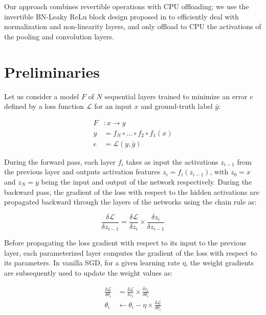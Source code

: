 \documentclass[11pt,onecolumn]{article}
\begin{document}
Our approach combines revertible operations with CPU offloading:
we use the invertible BN-Leaky ReLu block design proposed in \cite{rota2018place} 
to efficiently deal with normalization and non-linearity layers,
and only offload to CPU the activations of the pooling and convolution layers.

\section{Preliminaries}

Let us consider a model $F$ of $N$ sequential layers trained to minimize an error $e$ 
defined by a loss function $\mathcal{L}$ for an input $x$ and ground-truth label $\bar{y}$:

\begin{subequations}
	\begin{align}
	F &: x \rightarrow y \\
	y &= f_N \circ ... \circ f_2 \circ f_1(x) \\
	e &=  \mathcal{L}(y, \bar{y})
	\end{align}
\end{subequations}

During the forward pass, each layer $f_i$ takes as input the activations $z_{i-1}$ from the previous layer and outputs activation features $z_i=f_i(z_{i-1})$, with $z_0=x$ and $z_N=y$ being the input and output of the network respectively.
During the backward pass, the gradient of the loss with respect to the hidden activations are propagated backward through the layers of the networks using the chain rule as:

\begin{equation}
\frac{\delta \mathcal{L}}{\delta z_{i-1}} = \frac{\delta \mathcal{L}}{\delta z_{i}}  \times \frac{\delta z_{i}}{\delta z_{i-1}}
\end{equation}

Before propagating the loss gradient with respect to its input to the previous layer, 
each parameterized layer computes the gradient of the loss with respect to its parameters. 
In vanilla SGD, for a given learning rate $\eta$, the weight gradients are subsequently used to update the weight values as:

\begin{subequations}
	\begin{align}
	\frac{\delta \mathcal{L}}{\delta \theta_i} & =\frac{\delta \mathcal{L}}{\delta z_{i}}  \times \frac{\delta z_{i}}{\delta \theta_i} \\
	\theta_i & \leftarrow \theta_i - \eta \times \frac{\delta \mathcal{L}}{\delta \theta_i}
	\end{align}
\end{subequations}
\end{document}
